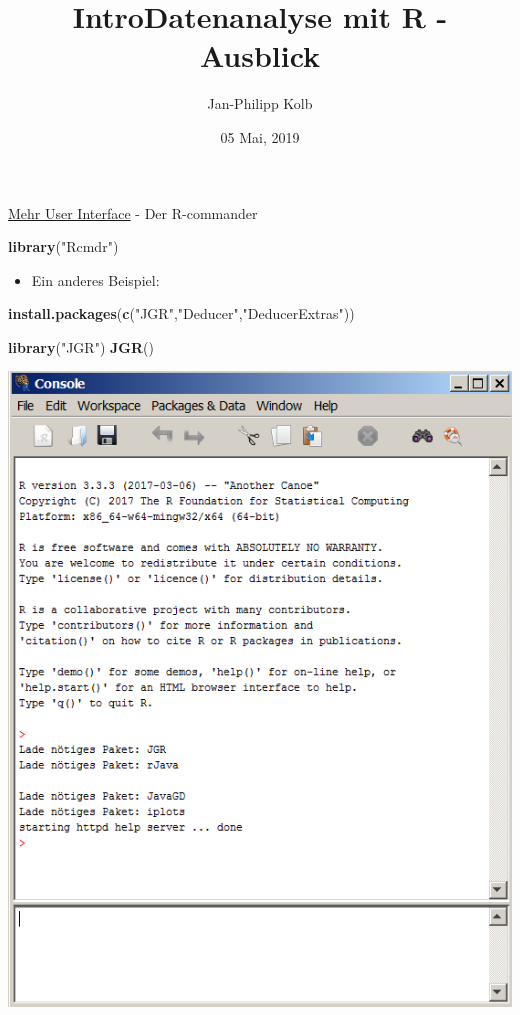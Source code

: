 \documentclass[
  ignorenonframetext,
]{beamer}
\title{IntroDatenanalyse mit R - Ausblick}
\author{Jan-Philipp Kolb}
\date{05 Mai, 2019}
\newenvironment{Shaded}{}{}
\newcommand{\KeywordTok}[1]{\textcolor[rgb]{0.00,0.44,0.13}{\textbf{#1}}}
\newcommand{\NormalTok}[1]{#1}
\newcommand{\StringTok}[1]{\textcolor[rgb]{0.25,0.44,0.63}{#1}}
\providecommand{\tightlist}{%
  \setlength{\itemsep}{0pt}\setlength{\parskip}{0pt}}
\begin{document}
\frame{\titlepage}

\begin{frame}[fragile]{\href{http://www.linuxlinks.com/article/20110306113701179/GUIsforR.html}{Mehr
User Interface} - Der R-commander}
\protect\hypertarget{mehr-user-interface---der-r-commander}{}

\begin{Shaded}
\begin{Highlighting}[]
\KeywordTok{library}\NormalTok{(}\StringTok{"Rcmdr"}\NormalTok{)}
\end{Highlighting}
\end{Shaded}

\begin{itemize}
\tightlist
\item
  Ein anderes Beispiel:
\end{itemize}

\begin{Shaded}
\begin{Highlighting}[]
\KeywordTok{install.packages}\NormalTok{(}\KeywordTok{c}\NormalTok{(}\StringTok{"JGR"}\NormalTok{,}\StringTok{"Deducer"}\NormalTok{,}\StringTok{"DeducerExtras"}\NormalTok{))}
\end{Highlighting}
\end{Shaded}

\begin{Shaded}
\begin{Highlighting}[]
\KeywordTok{library}\NormalTok{(}\StringTok{"JGR"}\NormalTok{)}
\KeywordTok{JGR}\NormalTok{()}
\end{Highlighting}
\end{Shaded}

\includegraphics{figure/Jaguar.PNG}


\end{frame}
\end{document}
